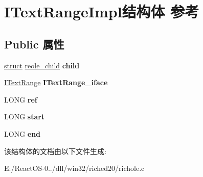 \hypertarget{struct_i_text_range_impl}{}\section{I\+Text\+Range\+Impl结构体 参考}
\label{struct_i_text_range_impl}
\subsection*{Public 属性}
\begin{DoxyCompactItemize}
\item 
\mbox{\label{struct_i_text_range_impl_ab5aa3ac35278549184c1215d59c2615c}} 
\hyperlink{interfacestruct}{struct} \hyperlink{structreole__child}{reole\+\_\+child} {\bfseries child}
\item 
\mbox{\label{struct_i_text_range_impl_a9fc35eda3ca43678d10c89bbbe0585db}} 
\hyperlink{interface_i_text_range}{I\+Text\+Range} {\bfseries I\+Text\+Range\+\_\+iface}
\item 
\mbox{\label{struct_i_text_range_impl_a62de0846d3f8b66205a42ee50836ae64}} 
L\+O\+NG {\bfseries ref}
\item 
\mbox{\label{struct_i_text_range_impl_a5c4600dba9927a4a4e8e232a34c286ed}} 
L\+O\+NG {\bfseries start}
\item 
\mbox{\label{struct_i_text_range_impl_a8b10e623c8bb935d4a39654678080e33}} 
L\+O\+NG {\bfseries end}
\end{DoxyCompactItemize}


该结构体的文档由以下文件生成\+:\begin{DoxyCompactItemize}
\item 
E\+:/\+React\+O\+S-\/0../dll/win32/riched20/richole.\+c\end{DoxyCompactItemize}
